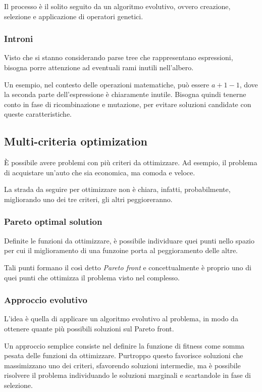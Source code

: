 \documentclass[a4paper]{article}
\begin{document}
Il processo è il solito seguito da un algoritmo evolutivo, 
ovvero creazione, selezione e applicazione di operatori genetici.

\subsubsection{Introni}
Visto che si stanno considerando parse tree che rappresentano espressioni, 
bisogna porre attenzione ad eventuali rami inutili nell'albero.

Un esempio, nel contesto delle operazioni matematiche, può essere 
$a + 1 - 1$, dove la seconda parte dell'espressione è chiaramente inutile.
Bisogna quindi tenerne conto in fase di ricombinazione e mutazione, per evitare 
soluzioni candidate con queste caratteristiche.

\subsection{Multi-criteria optimization}
È possibile avere problemi con più criteri da ottimizzare.
Ad esempio, il problema di acquistare un'auto che sia economica, 
ma comoda e veloce.

La strada da seguire per ottimizzare non è chiara, infatti, probabilmente, 
migliorando uno dei tre criteri, gli altri peggioreranno.

\subsubsection{Pareto optimal solution}
Definite le funzioni da ottimizzare, è possibile individuare quei punti nello 
spazio per cui il miglioramento di una funzoine porta al peggioramento delle altre.

Tali punti formano il così detto \emph{Pareto front} e concettualmente
è proprio uno di quei punti che ottimizza il problema visto nel complesso.

\subsubsection{Approccio evolutivo}
L'idea è quella di applicare un algoritmo evolutivo al problema, 
in modo da ottenere quante più possibili soluzioni sul Pareto front.

Un approccio semplice consiste nel definire la funzione di fitness come 
somma pesata delle funzioni da ottimizzare. Purtroppo questo favorisce
soluzioni che massimizzano uno dei criteri, sfavorendo soluzioni intermedie, 
ma è possibile risolvere il problema individuando le soluzioni marginali e scartandole
in fase di selezione.
\end{document}
